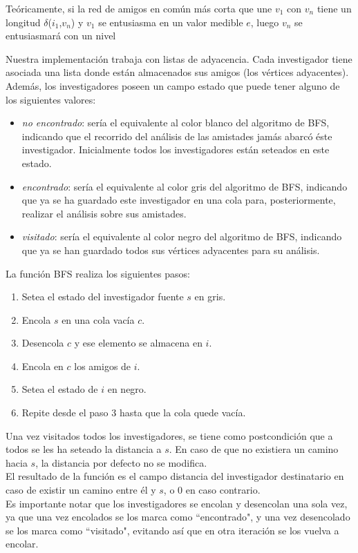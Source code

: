 \indent Teóricamente, si la red de amigos en común más corta que
une $v_1$ con $v_n$ tiene un longitud $\delta$($i_1$,$v_n$) y $v_1$ se
entusiasma en un valor medible $e$,
luego $v_n$ se
entusiasmará con un nivel

\indent Nuestra implementación trabaja con listas de adyacencia. Cada
investigador tiene asociada una lista donde están almacenados sus amigos (los
vértices adyacentes). Además, los investigadores poseen un campo estado que
puede tener alguno de los siguientes valores:

\begin{itemize}
\item \textit{no encontrado}: sería el equivalente al color blanco del algoritmo
de BFS, indicando que el recorrido del análisis de las amistades jamás abarcó
éste investigador. Inicialmente todos los investigadores están seteados
en este estado.
\item \textit{encontrado}: sería el equivalente al color gris del algoritmo de
BFS, indicando que ya se ha guardado este investigador en una cola para,
posteriormente, realizar el análisis sobre sus amistades.
\item \textit{visitado}: sería el equivalente al color negro del algoritmo de
BFS, indicando que ya se han guardado todos sus vértices adyacentes para su
análisis.
\end{itemize}

\hspace{-0.5cm}La función BFS realiza los siguientes pasos:
\begin{enumerate}
 \item Setea el estado del investigador fuente $s$ en gris.
 \item Encola $s$ en una cola vacía $c$.
 \item Desencola $c$ y ese elemento se almacena en $i$.
 \item Encola en $c$ los amigos de $i$.
 \item Setea el estado de $i$ en negro.
 \item Repite desde el paso 3 hasta que la cola quede vacía.
\end{enumerate}

\indent Una vez visitados todos los investigadores, se tiene como
postcondición que a todos se les ha seteado la distancia a $s$. En caso de que
no existiera un camino hacia $s$, la distancia por defecto no se modifica.\\ 
\indent El resultado de la función es el campo distancia del investigador
destinatario en caso de existir un camino entre él y $s$, o 0 en caso
contrario.\\
\indent Es importante notar que los investigadores se encolan y desencolan una
sola vez, ya que una vez encolados se los marca como ``encontrado", y una vez
desencolado se los marca como ``visitado", evitando así que en otra iteración se
los vuelva a encolar.

